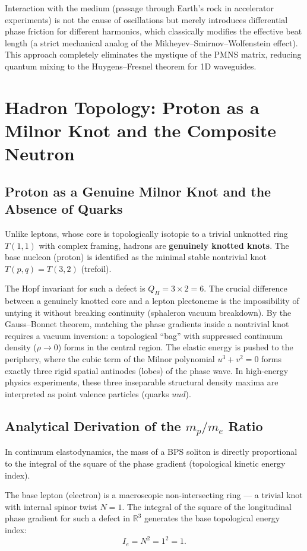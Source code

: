 \documentclass[11pt,a4paper]{article}
\begin{document}
Interaction with the medium (passage through Earth's rock in accelerator experiments) is not the cause of oscillations but merely introduces differential phase friction for different harmonics, which classically modifies the effective beat length (a strict mechanical analog of the Mikheyev–Smirnov–Wolfenstein effect). This approach completely eliminates the mystique of the PMNS matrix, reducing quantum mixing to the Huygens–Fresnel theorem for 1D waveguides.

\section{Hadron Topology: Proton as a Milnor Knot and the Composite Neutron}

\subsection{Proton as a Genuine Milnor Knot and the Absence of Quarks}
Unlike leptons, whose core is topologically isotopic to a trivial unknotted ring $T(1,1)$ with complex framing, hadrons are \textbf{genuinely knotted knots}.
The base nucleon (proton) is identified as the minimal stable nontrivial knot $T(p,q) = T(3,2)$ (trefoil).

The Hopf invariant for such a defect is $Q_H = 3 \times 2 = 6$.
The crucial difference between a genuinely knotted core and a lepton plectoneme is the impossibility of untying it without breaking continuity (sphaleron vacuum breakdown). By the Gauss–Bonnet theorem, matching the phase gradients inside a nontrivial knot requires a vacuum inversion: a topological ``bag'' with suppressed continuum density ($\rho \to 0$) forms in the central region.
The elastic energy is pushed to the periphery, where the cubic term of the Milnor polynomial $u^3+v^2=0$ forms exactly three rigid spatial antinodes (lobes) of the phase wave. In high-energy physics experiments, these three inseparable structural density maxima are interpreted as point valence particles (quarks $uud$).

\subsection{Analytical Derivation of the $m_p/m_e$ Ratio}
In continuum elastodynamics, the mass of a BPS soliton is directly proportional to the integral of the square of the phase gradient (topological kinetic energy index).

The base lepton (electron) is a macroscopic non-intersecting ring — a trivial knot with internal spinor twist $N=1$. The integral of the square of the longitudinal phase gradient for such a defect in $\mathbb{R}^3$ generates the base topological energy index:
\begin{equation}
I_e = N^2 = 1^2 = 1.
\end{equation}
\end{document}
